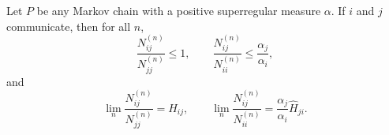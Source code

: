 Let $P$ be any Markov chain with a positive superregular measure $\alpha$. If $i$ and $j$ communicate, then for all $n$,
$$\frac{N_{ij}^{(n)}}{N_{jj}^{(n)}} \leq 1, \qquad \frac{N_{ij}^{(n)}}{N_{ii}^{(n)}} \leq \frac{\alpha_j}{\alpha_i},$$
and
$$\lim_n \frac{N_{ij}^{(n)}}{N_{jj}^{(n)}} = H_{ij}, \qquad \lim_n \frac{N_{ij}^{(n)}}{N_{ii}^{(n)}} = \frac{\alpha_j}{\alpha_i} \hat{H}_{ji}.$$
